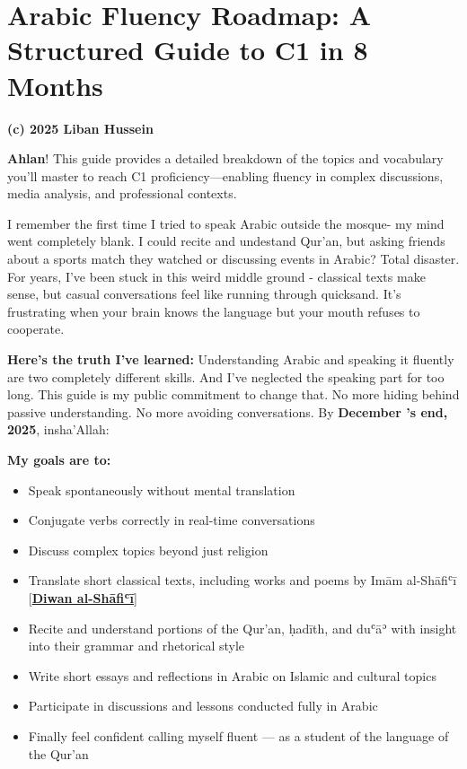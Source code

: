 \documentclass[
  letterpaper,
  DIV=11,
  numbers=noendperiod]{scrartcl}
\author{}
\date{}
\providecommand{\tightlist}{%
  \setlength{\itemsep}{0pt}\setlength{\parskip}{0pt}}
\begin{document}
\section{Arabic Fluency Roadmap: A Structured Guide to C1 in 8
Months}\label{arabic-fluency-roadmap-a-structured-guide-to-c1-in-8-months}

\textbf{(c) 2025 Liban Hussein}

\textbf{Ahlan}! This guide provides a detailed breakdown of the topics
and vocabulary you'll master to reach C1 proficiency---enabling fluency
in complex discussions, media analysis, and professional contexts.

I remember the first time I tried to speak Arabic outside the mosque- my
mind went completely blank. I could recite and undestand Qur'an, but
asking friends about a sports match they watched or discussing events in
Arabic? Total disaster. For years, I've been stuck in this weird middle
ground - classical texts make sense, but casual conversations feel like
running through quicksand. It's frustrating when your brain knows the
language but your mouth refuses to cooperate.

\textbf{Here's the truth I've learned:} Understanding Arabic and
speaking it fluently are two completely different skills. And I've
neglected the speaking part for too long. This guide is my public
commitment to change that. No more hiding behind passive understanding.
No more avoiding conversations. By \textbf{December 's end, 2025},
insha'Allah:

\textbf{My goals are to:}

\begin{itemize}
\tightlist
\item
  Speak spontaneously without mental translation
\item
  Conjugate verbs correctly in real-time conversations
\item
  Discuss complex topics beyond just religion
\item
  Translate short classical texts, including works and poems by Imām
  al-Shāfiʿī
  {[}\href{https://www.noor-book.com/en/ebook-\%D8\%AF\%D9\%8A\%D9\%88\%D8\%A7\%D9\%86-\%D8\%A7\%D9\%84\%D8\%A7\%D9\%85\%D8\%A7\%D9\%85-\%D8\%A7\%D9\%84\%D8\%B4\%D8\%A7\%D9\%81\%D8\%B9\%D9\%8A-pdf}{\textbf{Diwan
  al-Shāfiʿī}}{]}
\item
  Recite and understand portions of the Qur'an, ḥadīth, and duʿāʾ with
  insight into their grammar and rhetorical style
\item
  Write short essays and reflections in Arabic on Islamic and cultural
  topics
\item
  Participate in discussions and lessons conducted fully in Arabic
\item
  Finally feel confident calling myself fluent --- as a student of the
  language of the Qur'an
\end{itemize}
\end{document}
